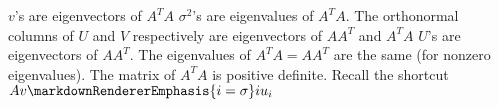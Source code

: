 \markdownRendererInterblockSeparator
{}\markdownRendererUlBegin
\markdownRendererUlItem $v$'s are eigenvectors of $A^TA$\markdownRendererUlItemEnd 
\markdownRendererUlItem $\sigma^2$'s are eigenvalues of $A^TA$.\markdownRendererUlItemEnd 
\markdownRendererUlItem The orthonormal columns of $U$ and $V$ respectively are eigenvectors of $AA^T$ and $A^TA$\markdownRendererUlItemEnd 
\markdownRendererUlItem $U$'s are eigenvectors of $AA^T$.\markdownRendererUlItemEnd 
\markdownRendererUlItem The eigenvalues of $A^TA=AA^T$ are the same (for nonzero eigenvalues).\markdownRendererUlItemEnd 
\markdownRendererUlItem The matrix of $A^TA$ is positive definite.\markdownRendererUlItemEnd 
\markdownRendererUlItem Recall the shortcut $Av\markdownRendererEmphasis{i=\sigma}i u_i$\markdownRendererUlItemEnd 
\markdownRendererUlEnd \relax